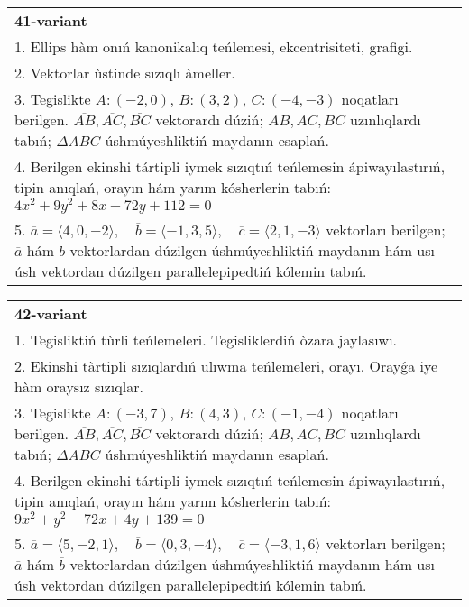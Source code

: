 \documentclass{article}
\begin{document}
\begin{tabular}{m{17cm}}
\textbf{41-variant}\\
1. Ellips hàm onıń kanonikalıq teńlemesi, ekcentrisiteti, grafigi.\\

2. Vektorlar ùstinde sızıqlı àmeller.\\

3. Tegislikte $A: (-2, 0)$, $B: (3, 2)$, $C: (-4, -3)$ noqatları berilgen. $\overline{AB}, \overline{AC}, \overline{BC}$ vektorardı dúziń; $AB, AC, BC$ uzınlıqlardı tabıń; $\Delta ABC$ úshmúyeshliktiń maydanın esaplań. \\

4. Berilgen ekinshi tártipli iymek sızıqtıń teńlemesin ápiwayılastırıń, tipin anıqlań, orayın hám yarım kósherlerin tabıń: $4x^2+9y^2+8x-72y+112=0$\\

5. \(\overline{a} = \langle 4, 0, -2 \rangle, \quad \overline{b} = \langle -1, 3, 5 \rangle, \quad \overline{c} = \langle 2, 1, -3 \rangle\) vektorları berilgen; \(\overline{a}\) hám \(\overline{b}\) vektorlardan dúzilgen úshmúyeshliktiń maydanın hám usı úsh vektordan dúzilgen parallelepipedtiń kólemin tabıń.
\end{tabular}
\vspace{1cm}


\begin{tabular}{m{17cm}}
\textbf{42-variant}\\
1. Tegisliktiń tùrli teńlemeleri. Tegisliklerdiń òzara jaylasıwı.\\

2. Ekinshi tàrtipli sızıqlardıń ulıwma teńlemeleri, orayı. Orayǵa iye hàm oraysız sızıqlar.\\

3. Tegislikte $A: (-3, 7)$, $B: (4, 3)$, $C: (-1, -4)$ noqatları berilgen. $\overline{AB}, \overline{AC}, \overline{BC}$ vektorardı dúziń; $AB, AC, BC$ uzınlıqlardı tabıń; $\Delta ABC$ úshmúyeshliktiń maydanın esaplań. \\

4. Berilgen ekinshi tártipli iymek sızıqtıń teńlemesin ápiwayılastırıń, tipin anıqlań, orayın hám yarım kósherlerin tabıń: $9x^2+y^2-72x+4y+139=0$\\

5. \(\overline{a} = \langle 5, -2, 1 \rangle, \quad \overline{b} = \langle 0, 3, -4 \rangle, \quad \overline{c} = \langle -3, 1, 6 \rangle\) vektorları berilgen; \(\overline{a}\) hám \(\overline{b}\) vektorlardan dúzilgen úshmúyeshliktiń maydanın hám usı úsh vektordan dúzilgen parallelepipedtiń kólemin tabıń.
\end{tabular}
\vspace{1cm}
\end{document}
